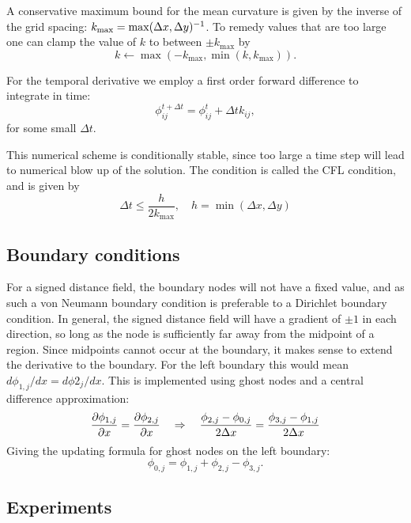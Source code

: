\documentclass[sigconf]{acmart}
\begin{document}
A conservative maximum bound for the mean curvature is given by the inverse of the grid spacing: $ k_{\max} = \max(\Delta x, \Delta y)^{-1} $. To remedy values that are too large one can clamp the value of $ k $ to between $ \pm k_{\max} $ by
\begin{equation}\label{key}
	k\leftarrow \max(-k_{\max}, \min(k, k_{\max})).
\end{equation}

For the temporal derivative we employ a first order forward difference to integrate in time:
\begin{equation}\label{key}
	\phi_{ij}^{t+\Delta t} = \phi_{ij}^t + \Delta t k_{ij}, 
\end{equation}
for some small $ \Delta t $.

This numerical scheme is conditionally stable, since too large a time step will lead to numerical blow up of the solution. The condition is called the CFL condition, and is given by
\begin{equation}\label{key}
	\Delta t \leq \frac{h}{2k_{\max}}, \quad h = \min(\Delta x, \Delta y)
\end{equation}

\subsection{Boundary conditions}
For a signed distance field, the boundary nodes will not have a fixed value, and as such a von Neumann boundary condition is preferable to a Dirichlet boundary condition. In general, the signed distance field will have a gradient of $ \pm 1 $ in each direction, so long as the node is sufficiently far away from the midpoint of a region. Since midpoints cannot occur at the boundary, it makes sense to extend the derivative to the boundary. For the left boundary this would mean $ d\phi_{1,j}/dx = d\phi{2_j}/dx$. This is implemented using ghost nodes and a central difference approximation:
\begin{equation}\label{key}
	\frac{\partial \phi_{1,j}}{\partial x} = \frac{\partial \phi_{2,j}}{\partial x} \quad \Rightarrow \quad \frac{\phi_{2,j} - \phi_{0,j}}{2\Delta x} = \frac{\phi_{3,j} - \phi_{1,j}}{2 \Delta x}
\end{equation}
Giving the updating formula for ghost nodes on the left boundary:
\begin{equation}\label{key}
	\phi_{0,j} = \phi_{1,j} + \phi_{2,j} - \phi_{3,j}.
\end{equation}

\subsection{Experiments}
\end{document}
